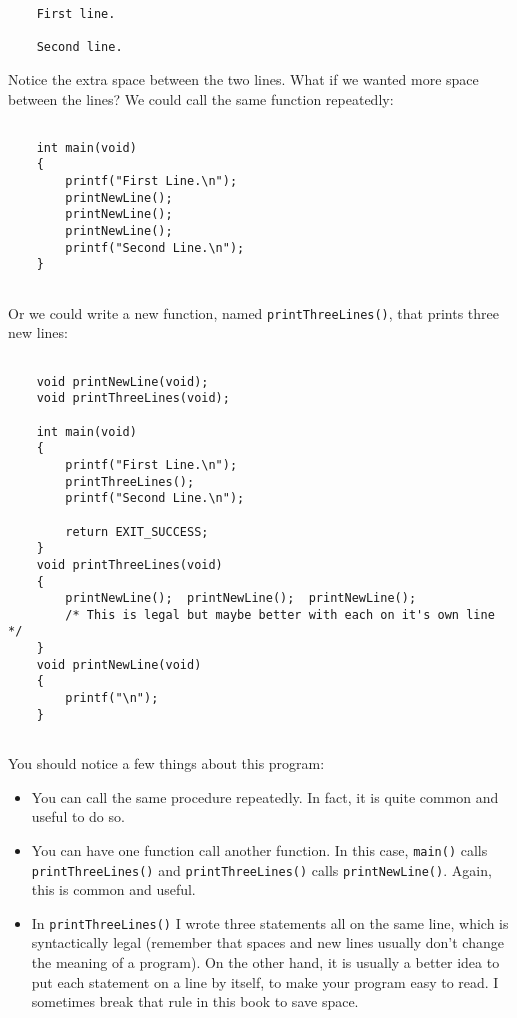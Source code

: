 \begin{verbatim}
    First line.

    Second line.
\end{verbatim}
%
Notice the extra space between the two lines.  What if we wanted
more space between the lines?  We could call the same
function repeatedly:

\begin{verbatim}

    int main(void)
    {
        printf("First Line.\n");
        printNewLine();
        printNewLine();
        printNewLine();
        printf("Second Line.\n");
    }
  
\end{verbatim}
%
Or we could write a new function, named {\tt printThreeLines()}, that 
prints three new lines:

\begin{verbatim}

    void printNewLine(void); 
    void printThreeLines(void);
    
    int main(void)
    {
        printf("First Line.\n");
        printThreeLines();
        printf("Second Line.\n");
        
        return EXIT_SUCCESS;
    }
    void printThreeLines(void)
    {
        printNewLine();  printNewLine();  printNewLine(); 
        /* This is legal but maybe better with each on it's own line */
    }
    void printNewLine(void)  
    {
        printf("\n");
    }
   
\end{verbatim}
%
You should notice a few things about this program:

\begin{itemize}

\item You can call the same procedure repeatedly.  In
fact, it is quite common and useful to do so.

\item You can have one function call another function.  In this
case, {\tt main()} calls {\tt printThreeLines()} and {\tt printThreeLines()}
calls {\tt printNewLine()}.  Again, this is common and useful.

\item In {\tt printThreeLines()} I wrote three statements all on the
same line, which is syntactically legal (remember that spaces
and new lines usually don't change the meaning of a program).
On the other hand, it is usually a better idea to put each
statement on a line by itself, to make your program easy to
read.  I sometimes break that rule in this book to save space.

\end{itemize}

